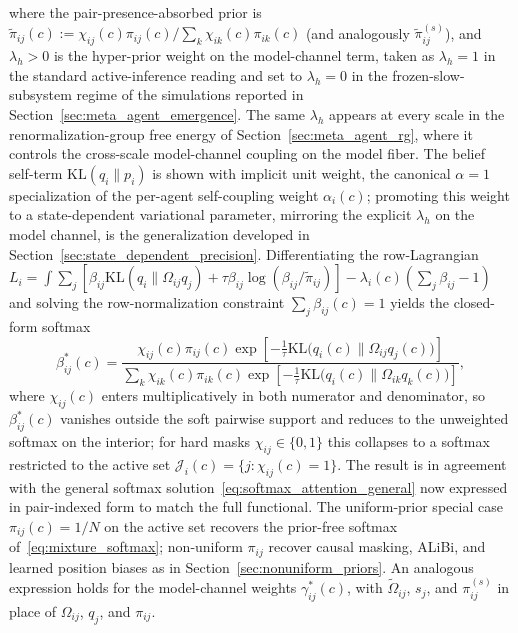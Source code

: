 \documentclass[11pt]{article}
\begin{document}
where the pair-presence-absorbed prior is $\tilde{\pi}_{ij}(c) := \chi_{ij}(c)\pi_{ij}(c) / \sum_k \chi_{ik}(c)\pi_{ik}(c)$ (and analogously $\tilde{\pi}^{(s)}_{ij}$), and $\lambda_h > 0$ is the hyper-prior weight on the model-channel term, taken as $\lambda_h = 1$ in the standard active-inference reading and set to $\lambda_h = 0$ in the frozen-slow-subsystem regime of the simulations reported in Section~\ref{sec:meta_agent_emergence}. The same $\lambda_h$ appears at every scale in the renormalization-group free energy of Section~\ref{sec:meta_agent_rg}, where it controls the cross-scale model-channel coupling on the model fiber. The belief self-term $\mathrm{KL}(q_i \| p_i)$ is shown with implicit unit weight, the canonical $\alpha = 1$ specialization of the per-agent self-coupling weight $\alpha_i(c)$; promoting this weight to a state-dependent variational parameter, mirroring the explicit $\lambda_h$ on the model channel, is the generalization developed in Section~\ref{sec:state_dependent_precision}. Differentiating the row-Lagrangian $L_i = \int \sum_j[\beta_{ij}\mathrm{KL}(q_i \| \Omega_{ij} q_j) + \tau\beta_{ij}\log(\beta_{ij}/\tilde{\pi}_{ij})] - \lambda_i(c)(\sum_j \beta_{ij} - 1)$ and solving the row-normalization constraint $\sum_j \beta_{ij}(c) = 1$ yields the closed-form softmax
\begin{equation}
\beta_{ij}^*(c) =
\frac{
  \chi_{ij}(c)\pi_{ij}(c)\exp\left[
    -\tfrac{1}{\tau}\mathrm{KL}\big(q_i(c) \big\| \Omega_{ij}q_j(c)\big)
  \right]
}{
  \displaystyle\sum_{k}
  \chi_{ik}(c)\pi_{ik}(c)\exp\left[
    -\tfrac{1}{\tau}\mathrm{KL}\big(q_i(c) \big\| \Omega_{ik}q_k(c)\big)
  \right]
},
\label{eq:beta_optimal}
\end{equation}
where $\chi_{ij}(c)$ enters multiplicatively in both numerator and denominator, so $\beta^*_{ij}(c)$ vanishes outside the soft pairwise support and reduces to the unweighted softmax on the interior; for hard masks $\chi_{ij} \in \{0, 1\}$ this collapses to a softmax restricted to the active set $\mathcal{J}_i(c) = \{j : \chi_{ij}(c) = 1\}$. The result is in agreement with the general softmax solution~\eqref{eq:softmax_attention_general} now expressed in pair-indexed form to match the full functional. The uniform-prior special case $\pi_{ij}(c) = 1/N$ on the active set recovers the prior-free softmax of~\eqref{eq:mixture_softmax}; non-uniform $\pi_{ij}$ recover causal masking, ALiBi, and learned position biases as in Section~\ref{sec:nonuniform_priors}. An analogous expression holds for the model-channel weights $\gamma_{ij}^*(c)$, with $\tilde{\Omega}_{ij}$, $s_j$, and $\pi^{(s)}_{ij}$ in place of $\Omega_{ij}$, $q_j$, and $\pi_{ij}$.
\end{document}
